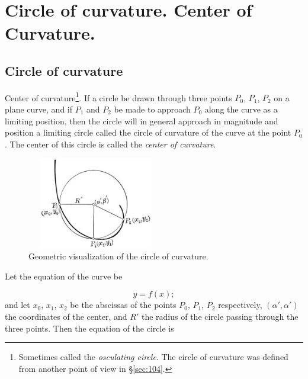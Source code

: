 
\chapter{Circle of curvature. Center of Curvature.}
\label{ch:14}


\section{Circle of curvature}
\label{sec:116}

Center of curvature\footnote{Sometimes called the 
{\it osculating circle}. The circle of curvature was defined from 
another point of view in \S \ref{sec:104}.}. If a circle be drawn 
through three points $P_0$, $P_1$, $P_2$ on a plane curve, and if 
$P_1$ and $P_2$ be made to approach $P_0$ along the curve as a 
limiting position, then the circle will in general approach in 
magnitude and position a limiting circle called the circle of 
curvature of the curve at the point $P_0$. The center of this 
circle is called the {\it center of curvature}.

\begin{figure}[h!]
\begin{minipage}{\textwidth}
\begin{center}
\includegraphics[height=4cm,width=6cm]{circle-of-curvature.eps}
\end{center}
\end{minipage}
\caption{Geometric visualization of the circle of curvature.}
\label{fig:circle-of-curvature}
\end{figure}

Let the equation of the curve be

\begin{equation}
\label{eqn:116-1}
y = f(x);
\end{equation}
and let $x_0$, $x_1$, $x_2$ be the abscissas of the points 
$P_0$, $P_1$, $P_2$ respectively, $(\alpha',\alpha')$ the coordinates 
of the center, and $R'$ the radius of the circle passing through 
the three points. Then the equation of the circle is

